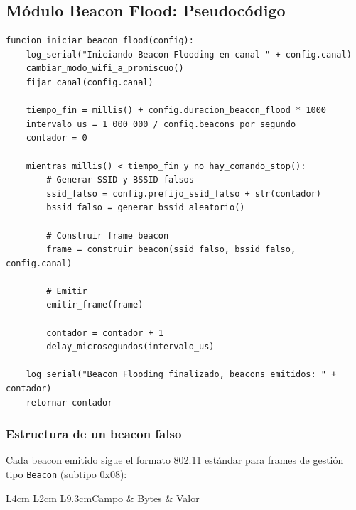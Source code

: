 \documentclass[11pt,a4paper]{article}
\begin{document}
\subsection{Módulo Beacon Flood: Pseudocódigo}

\begin{lstlisting}
funcion iniciar_beacon_flood(config):
    log_serial("Iniciando Beacon Flooding en canal " + config.canal)
    cambiar_modo_wifi_a_promiscuo()
    fijar_canal(config.canal)

    tiempo_fin = millis() + config.duracion_beacon_flood * 1000
    intervalo_us = 1_000_000 / config.beacons_por_segundo
    contador = 0

    mientras millis() < tiempo_fin y no hay_comando_stop():
        # Generar SSID y BSSID falsos
        ssid_falso = config.prefijo_ssid_falso + str(contador)
        bssid_falso = generar_bssid_aleatorio()

        # Construir frame beacon
        frame = construir_beacon(ssid_falso, bssid_falso, config.canal)

        # Emitir
        emitir_frame(frame)

        contador = contador + 1
        delay_microsegundos(intervalo_us)

    log_serial("Beacon Flooding finalizado, beacons emitidos: " + contador)
    retornar contador
\end{lstlisting}

\subsubsection{Estructura de un beacon falso}
Cada beacon emitido sigue el formato 802.11 estándar para frames de
gestión tipo \texttt{Beacon} (subtipo 0x08):

\begin{datatable}{L{4cm} L{2cm} L{9.3cm}}{Campo & Bytes & Valor}
\end{datatable}
\end{document}
